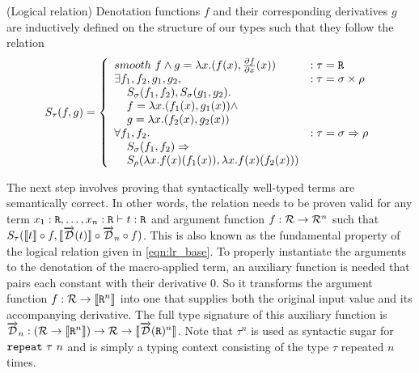   \begin{definition}(Logical relation)
    Denotation functions $f$ and their corresponding derivatives $g$ are inductively defined on the structure of our types such that they follow the relation
    \begin{equation*}
      S_\tau(f, g) =
        \left\{
          \begin{array}{ll}
            smooth\ f \wedge
              g = \lambda x. (f(x), \frac{\partial f}{\partial x}(x))
              & : \tau = \texttt{R} \\
            \exists f_1, f_2, g_1, g_2,
              & : \tau = \sigma \times \rho \\
              \;\;\;\;S_\sigma(f_1, f_2), S_\sigma(g_1, g_2). \\
              \;\;\;\;f = \lambda x. (f_1(x), g_1(x)) \wedge \\
              \;\;\;\;g = \lambda x. (f_2(x), g_2(x)) \\
            \forall f_1, f_2.
              & : \tau = \sigma \Rightarrow \rho \\
              \;\;\;\;S_\sigma(f_1, f_2) \Rightarrow \\
              \;\;\;\;S_\rho(\lambda x. f(x)(f_1(x)),\lambda x. f(x)(f_2(x)))
          \end{array}
        \right.
    \label{eqn:lr_base}
    \end{equation*}
  \end{definition}

  The next step involves proving that syntactically well-typed terms are semantically correct.
  In other words, the relation needs to be proven valid for any term $x_1 : \texttt{R}, \dots, x_n : \texttt{R} \vdash t : \texttt{R}$ and argument function $f : \mathcal{R} \rightarrow \mathcal{R}^n$ such that $S_\tau(\llbracket t \rrbracket \circ f, \llbracket \overrightarrow{\mathcal{D}}(t) \rrbracket \circ \overrightarrow{\mathcal{D}}_n \circ f)$.
  This is also known as the fundamental property of the logical relation given in \cref{eqn:lr_base}.
  To properly instantiate the arguments to the denotation of the macro-applied term, an auxiliary function is needed that pairs each constant with their derivative $0$.
  So it transforms the argument function $f : \mathcal{R} \rightarrow \llbracket \texttt{R}^n \rrbracket$ into one that supplies both the original input value and its accompanying derivative.
  The full type signature of this auxiliary function is $\overrightarrow{\mathcal{D}}_n : (\mathcal{R} \rightarrow \llbracket \texttt{R}^n \rrbracket) \rightarrow \mathcal{R} \rightarrow \llbracket \overrightarrow{\mathcal{D}}(\texttt{R})^n \rrbracket$. Note that $\tau^n$ is used as syntactic sugar for $\texttt{repeat}\ \tau\ n$ and is simply a typing context consisting of the type $\tau$ repeated $n$ times.

